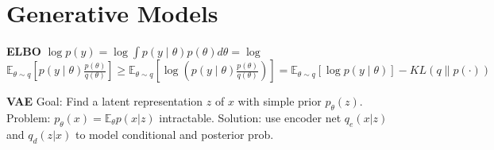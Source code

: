 \section{Generative Models}

\textbf{ELBO} $\log p(y) = \log \int p(y \mid \theta) p(\theta) d \theta = \log $ \\ $\mathbb{E}_{\theta \sim q}\left[p(y \mid \theta) \frac{p(\theta)}{q(\theta)}\right] \geq \mathbb{E}_{\theta \sim q}\left[\log \left(p(y \mid \theta) \frac{p(\theta)}{q(\theta)}\right)\right]  = \mathbb{E}_{\theta \sim q}[\log p(y \mid \theta)]-K L(q \| p(\cdot))$

\textbf{VAE} Goal: Find a latent representation $z$ of $x$ with simple prior $p_\theta(z)$. Problem: $p_\theta(x) = \mathbb{E}_{\theta}p(x|z)$ intractable. Solution: use encoder net $q_e(x|z)$ and $q_d(z|x)$ to model conditional and posterior prob.


